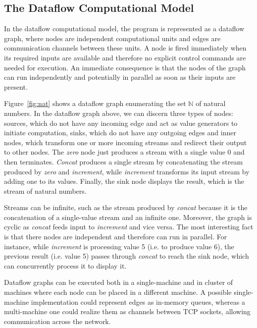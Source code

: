 \documentclass[sigplan,screen]{acmart}
\begin{document}
\subsection{The Dataflow Computational Model}
In the dataflow computational model, the program is represented as a dataflow graph, where
nodes are independent computational units and edges are communication channels
between these units. A node is fired immediately when its required inputs are
available and therefore no explicit control commands are needed for execution.
An immediate consequence is that the nodes of the graph can run independently
and potentially in parallel as soon as their inputs are present.

Figure~\ref{fig:nat} shows a dataflow graph enumerating the set $\mathbb{N}$ of
natural numbers.
%
%
In the dataflow graph above, we can discern three types of nodes: sources, which
do not have any incoming edge and act as value generators to initiate
computation, sinks, which do not have any outgoing edges and inner nodes, which
transform one or more incoming streams and redirect their output to other nodes.
The \textit{zero} node just produces a stream with a single value 0 and then
terminates. \textit{Concat} produces a single stream by concatenating the stream
produced by \textit{zero} and \textit{increment}, while \textit{increment}
transforms its input stream by adding one to its values. Finally, the sink node
displays the result, which is the stream of natural numbers.

Streams can be infinite, such as the stream produced by \textit{concat} because
it is the concatenation of a single-value stream and an infinite one. Moreover,
the graph is cyclic as \textit{concat} feeds input to \textit{increment} and
vice versa. The most interesting fact is that there nodes are independent and
therefore can run in parallel. For instance, while \textit{increment} is
processing value 5 (i.e. to produce value 6), the previous result (i.e. value 5)
passes through \textit{concat} to reach the sink node, which can concurrently
process it to display it.

Dataflow graphs can be executed both in a single-machine and in cluster of
machines where each node can be placed in a different machine. A possible
single-machine implementation could represent edges as in-memory queues,
whereas a multi-machine one could realize them as channels between TCP sockets,
allowing communication across the network.
\end{document}
